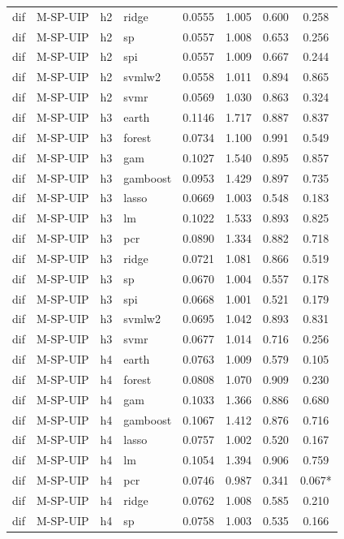 \begin{ThreePartTable}
\begin{longtable}[t]{llclcccc}
dif & M-SP-UIP & h2 & ridge & 0.0555 & 1.005 & 0.600 & 0.258\\
dif & M-SP-UIP & h2 & sp & 0.0557 & 1.008 & 0.653 & 0.256\\
dif & M-SP-UIP & h2 & spi & 0.0557 & 1.009 & 0.667 & 0.244\\
dif & M-SP-UIP & h2 & svmlw2 & 0.0558 & 1.011 & 0.894 & 0.865\\
dif & M-SP-UIP & h2 & svmr & 0.0569 & 1.030 & 0.863 & 0.324\\
\addlinespace
dif & M-SP-UIP & h3 & earth & 0.1146 & 1.717 & 0.887 & 0.837\\
dif & M-SP-UIP & h3 & forest & 0.0734 & 1.100 & 0.991 & 0.549\\
dif & M-SP-UIP & h3 & gam & 0.1027 & 1.540 & 0.895 & 0.857\\
dif & M-SP-UIP & h3 & gamboost & 0.0953 & 1.429 & 0.897 & 0.735\\
dif & M-SP-UIP & h3 & lasso & 0.0669 & 1.003 & 0.548 & 0.183\\
dif & M-SP-UIP & h3 & lm & 0.1022 & 1.533 & 0.893 & 0.825\\
dif & M-SP-UIP & h3 & pcr & 0.0890 & 1.334 & 0.882 & 0.718\\
dif & M-SP-UIP & h3 & ridge & 0.0721 & 1.081 & 0.866 & 0.519\\
dif & M-SP-UIP & h3 & sp & 0.0670 & 1.004 & 0.557 & 0.178\\
dif & M-SP-UIP & h3 & spi & 0.0668 & 1.001 & 0.521 & 0.179\\
dif & M-SP-UIP & h3 & svmlw2 & 0.0695 & 1.042 & 0.893 & 0.831\\
dif & M-SP-UIP & h3 & svmr & 0.0677 & 1.014 & 0.716 & 0.256\\
\addlinespace
dif & M-SP-UIP & h4 & earth & 0.0763 & 1.009 & 0.579 & 0.105\\
dif & M-SP-UIP & h4 & forest & 0.0808 & 1.070 & 0.909 & 0.230\\
dif & M-SP-UIP & h4 & gam & 0.1033 & 1.366 & 0.886 & 0.680\\
dif & M-SP-UIP & h4 & gamboost & 0.1067 & 1.412 & 0.876 & 0.716\\
dif & M-SP-UIP & h4 & lasso & 0.0757 & 1.002 & 0.520 & 0.167\\
dif & M-SP-UIP & h4 & lm & 0.1054 & 1.394 & 0.906 & 0.759\\
dif & M-SP-UIP & h4 & pcr & 0.0746 & 0.987 & 0.341 & 0.067*\\
dif & M-SP-UIP & h4 & ridge & 0.0762 & 1.008 & 0.585 & 0.210\\
dif & M-SP-UIP & h4 & sp & 0.0758 & 1.003 & 0.535 & 0.166\\

\end{longtable}
\end{ThreePartTable}

